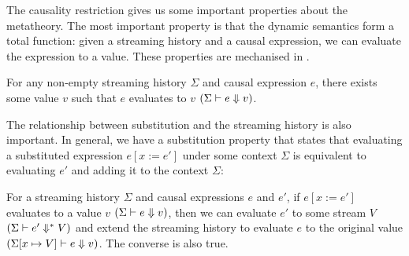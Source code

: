 The causality restriction gives us some important properties about the metatheory.
The most important property is that the dynamic semantics form a total function: given a streaming history and a causal expression, we can evaluate the expression to a value.
These properties are mechanised in \fstar{}.


\begin{theorem}
  For any non-empty streaming history $\Sigma$ and causal expression $e$, there exists some value $v$ such that $e$ evaluates to $v$ $(\Sigma \vdash e \Downarrow v)$.
\end{theorem}

The relationship between substitution and the streaming history is also important.
In general, we have a substitution property that states that evaluating a substituted expression $e[x := e']$ under some context $\Sigma$ is equivalent to evaluating $e'$ and adding it to the context $\Sigma$:

\begin{theorem}
  For a streaming history $\Sigma$ and causal expressions $e$ and $e'$, if $e[x := e']$ evaluates to a value $v$ $(\Sigma \vdash e \Downarrow v)$, then we can evaluate $e'$ to some stream $V$ $(\Sigma \vdash e' \Downarrow^{*} V)$ and extend the streaming history to evaluate $e$ to the original value $(\Sigma[x \mapsto V] \vdash e \Downarrow v)$.
  The converse is also true.
\end{theorem}


